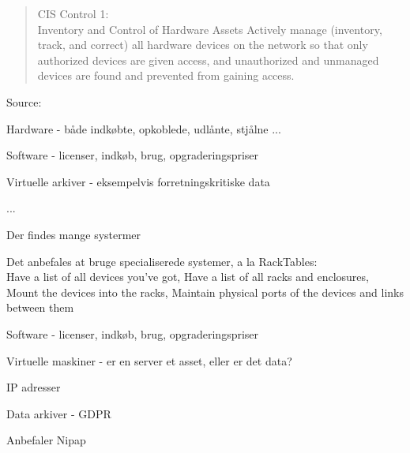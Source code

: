 \documentclass[Screen16to9,17pt]{foils}
\begin{document}

\begin{quote}
CIS Control 1:\\
Inventory and Control of Hardware Assets
Actively manage (inventory, track, and correct) all hardware devices on the network so that only
authorized devices are given access, and unauthorized and unmanaged devices are found and
prevented from gaining access.
\end{quote}
Source: 

\begin{list2}
\item Hardware - både indkøbte, opkoblede, udlånte, stjålne ...
\item Software - licenser, indkøb, brug, opgraderingspriser
\item Virtuelle arkiver - eksempelvis forretningskritiske data
\item ...
\end{list2}




\begin{list2}
\item Der findes mange systermer
\item Det anbefales at bruge specialiserede systemer, a la RackTables:\\
Have a list of all devices you've got,
Have a list of all racks and enclosures,
Mount the devices into the racks,
Maintain physical ports of the devices and links between them
\end{list2}



\begin{list2}
\item Software - licenser, indkøb, brug, opgraderingspriser
\item Virtuelle maskiner - er en server et asset, eller er det data?
\item IP adresser
\item Data arkiver - GDPR
\end{list2}


\begin{list2}
\item Anbefaler Nipap 
\end{list2}
\end{document}
